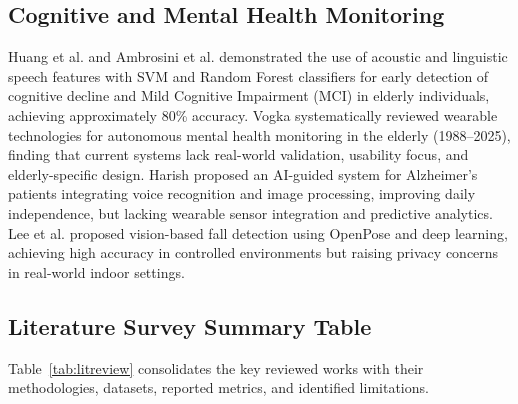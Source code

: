 \documentclass[conference]{IEEEtran}
\begin{document}
\subsection{Cognitive and Mental Health Monitoring}

Huang et al. \cite{b26} and Ambrosini et al. \cite{b27} demonstrated the use of acoustic and linguistic speech features with SVM and Random Forest classifiers for early detection of cognitive decline and Mild Cognitive Impairment (MCI) in elderly individuals, achieving approximately 80\% accuracy. Vogka \cite{b28} systematically reviewed wearable technologies for autonomous mental health monitoring in the elderly (1988--2025), finding that current systems lack real-world validation, usability focus, and elderly-specific design. Harish \cite{b29} proposed an AI-guided system for Alzheimer's patients integrating voice recognition and image processing, improving daily independence, but lacking wearable sensor integration and predictive analytics. Lee et al. \cite{b36} proposed vision-based fall detection using OpenPose and deep learning, achieving high accuracy in controlled environments but raising privacy concerns in real-world indoor settings.

\subsection{Literature Survey Summary Table}

Table~\ref{tab:litreview} consolidates the key reviewed works with their methodologies, datasets, reported metrics, and identified limitations.
\end{document}

